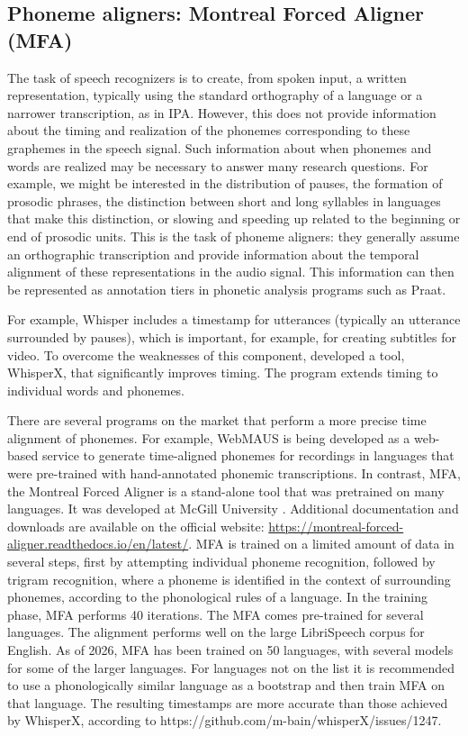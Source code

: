
\subsection{Phoneme aligners: Montreal Forced Aligner (MFA)}

The task of speech recognizers is to create, from spoken input, a written representation, typically using the standard orthography of a language or a narrower transcription, as in IPA. However, this does not provide information about the timing and realization of the phonemes corresponding to these graphemes in the speech signal. Such information about when phonemes and words are realized may be necessary to answer many research questions. For example, we might be interested in the distribution of pauses, the formation of prosodic phrases, the distinction between short and long syllables in languages that make this distinction, or slowing and speeding up related to the beginning or end of prosodic units. This is the task of phoneme aligners: they generally assume an orthographic transcription and provide information about the temporal alignment of these representations in the audio signal. This information can then be represented as annotation tiers in phonetic analysis programs such as Praat.

For example, Whisper includes a timestamp for utterances (typically an utterance surrounded by pauses), which is important, for example, for creating subtitles for video. To overcome the weaknesses of this component, \cite{bain2023whisperx} developed a tool, WhisperX, that significantly improves timing. The program extends timing to individual words and phonemes.

There are several programs on the market that perform a more precise time alignment of phonemes. For example, WebMAUS \cite{kisler2012} is being developed as a web-based service to generate time-aligned phonemes for recordings in languages that were pre-trained with hand-annotated phonemic transcriptions. In contrast, MFA, the Montreal Forced Aligner is a stand-alone tool that was pretrained on many languages. It was developed at McGill University \cite{mcauliffe2017mfa}. Additional documentation and downloads are available on the official website: \url{https://montreal-forced-aligner.readthedocs.io/en/latest/}. MFA is trained on a limited amount of data in several steps, first by attempting individual phoneme recognition, followed by trigram recognition, where a phoneme is identified in the context of surrounding phonemes, according to the phonological rules of a language. In the training phase, MFA performs 40 iterations. The MFA comes pre-trained for several languages.  The alignment performs well on the large LibriSpeech corpus for English. As of 2026, MFA has been trained on 50 languages, with several models for some of the larger languages. For languages not on the list it is recommended to use a phonologically similar language as a bootstrap and then train MFA on that language. The resulting timestamps are more accurate than those achieved by WhisperX, according to https://github.com/m-bain/whisperX/issues/1247.

